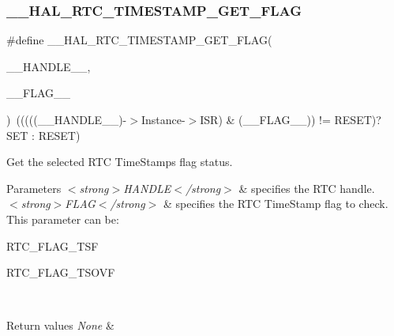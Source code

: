 \subsubsection{\texorpdfstring{\+\_\+\+\_\+\+H\+A\+L\+\_\+\+R\+T\+C\+\_\+\+T\+I\+M\+E\+S\+T\+A\+M\+P\+\_\+\+G\+E\+T\+\_\+\+F\+L\+AG}{\_\_HAL\_RTC\_TIMESTAMP\_GET\_FLAG}}
{\footnotesize\ttfamily \#define \+\_\+\+\_\+\+H\+A\+L\+\_\+\+R\+T\+C\+\_\+\+T\+I\+M\+E\+S\+T\+A\+M\+P\+\_\+\+G\+E\+T\+\_\+\+F\+L\+AG(\begin{DoxyParamCaption}\item[{}]{\+\_\+\+\_\+\+H\+A\+N\+D\+L\+E\+\_\+\+\_\+,  }\item[{}]{\+\_\+\+\_\+\+F\+L\+A\+G\+\_\+\+\_\+ }\end{DoxyParamCaption})~(((((\+\_\+\+\_\+\+H\+A\+N\+D\+L\+E\+\_\+\+\_\+)-\/$>$Instance-\/$>$I\+SR) \& (\+\_\+\+\_\+\+F\+L\+A\+G\+\_\+\+\_\+)) != R\+E\+S\+ET)? S\+ET \+: R\+E\+S\+ET)}



Get the selected R\+TC Time\+Stamp\textquotesingle{}s flag status. 


\begin{DoxyParams}{Parameters}
{\em $<$strong$>$\+H\+A\+N\+D\+L\+E$<$/strong$>$} & specifies the R\+TC handle. \\
\hline
{\em $<$strong$>$\+F\+L\+A\+G$<$/strong$>$} & specifies the R\+TC Time\+Stamp flag to check. This parameter can be\+: \begin{DoxyItemize}
\item R\+T\+C\+\_\+\+F\+L\+A\+G\+\_\+\+T\+SF \item R\+T\+C\+\_\+\+F\+L\+A\+G\+\_\+\+T\+S\+O\+VF \end{DoxyItemize}
\\
\hline
\end{DoxyParams}

\begin{DoxyRetVals}{Return values}
{\em None} & \\
\hline
\end{DoxyRetVals}
\mbox{\label{group___r_t_c_ex___timestamp_gaaf023d7dd4c3068e8297187f2cc6b16e}} 
